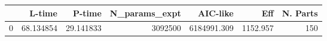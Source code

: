 \begin{tabular}{lrrrrrr}
\toprule
{} &     L-time &     P-time &  N\_params\_expt &     AIC-like &       Eff &  N. Parts \\
\midrule
0 &  68.134854 &  29.141833 &        3092500 &  6184991.309 &  1152.957 &       150 \\
\bottomrule
\end{tabular}
